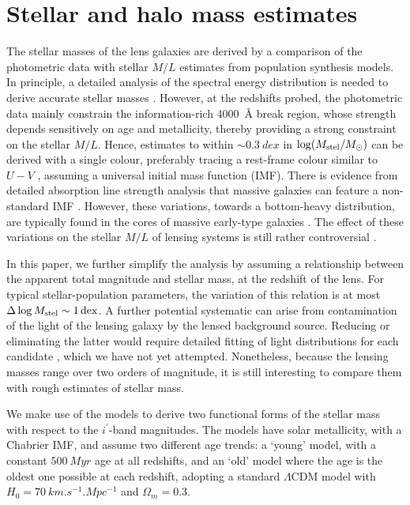 
\section{Stellar and halo mass estimates}
\label{sec:stellar-mass}

The stellar masses of the lens galaxies are derived by a comparison of
the photometric data with stellar $M/L$ estimates from population
synthesis models.  In principle, a detailed analysis of the spectral
energy distribution is needed to derive accurate stellar masses
\citep[e.g.][]{2009ApJS..185..253G,2011MNRAS.418.1587T}.  However,
at the redshifts probed, the photometric data mainly
constrain the information-rich \SI{4000}{\angstrom} break region, whose
strength depends sensitively on age and metallicity, thereby
providing a strong constraint on the stellar $M/L$.  Hence,
estimates to within $\sim \SI{0.3}{dex}$ in $\log(M_\text{stel}/M_\odot)$ can be derived
with a single colour, preferably tracing a rest-frame colour similar
to $U-V$ \citep[see Fig.~1 of][]{2008MNRAS.383..857F}, assuming
a universal initial mass function (IMF).  There is
evidence from detailed absorption line strength analysis that massive
galaxies can feature a non-standard IMF 
\citep[e.g.][]{2013MNRAS.429L..15F}. However, these variations,
towards a bottom-heavy distribution, are typically found in the
cores of massive early-type galaxies \citep{2016MNRAS.457.1468L}. The
effect of these variations on the stellar $M/L$ of lensing systems is
still rather controversial
\citep{2015MNRAS.449.3441S,2016MNRAS.459.3677L}.

In this paper, we further simplify the analysis by assuming a
relationship between the apparent total magnitude and stellar mass, at
the redshift of the lens.  For typical stellar-population parameters,
the variation of this relation is at most
$\Delta \log M_\text{stel} \sim \SI{1}{dex}$.
A further potential systematic can arise from contamination of the
light of the lensing galaxy by the lensed background source.  Reducing
or eliminating the latter would require detailed fitting of light
distributions for each candidate \citep[see][]{2011ApJ...740...97L},
which we have not yet attempted.  Nonetheless, because the lensing
masses range over two orders of magnitude, it is still interesting to
compare them with rough estimates of stellar mass.

We make use of the \citet{2003MNRAS.344.1000B} models to derive two
functional forms of the stellar mass with respect to the $i^{\prime}$-band
magnitudes. The models have solar metallicity, with a Chabrier IMF,
and assume two different age trends: a `young' model, with a
constant $\SI{500}{Myr}$ age at all redshifts, and an `old' model where the
age is the oldest one possible at each redshift, adopting a standard
$\Lambda$CDM model with $H_0 = \SI{70}{km.s^{-1}.Mpc^{-1}}$ and
$\Omega_m=0.3$.

